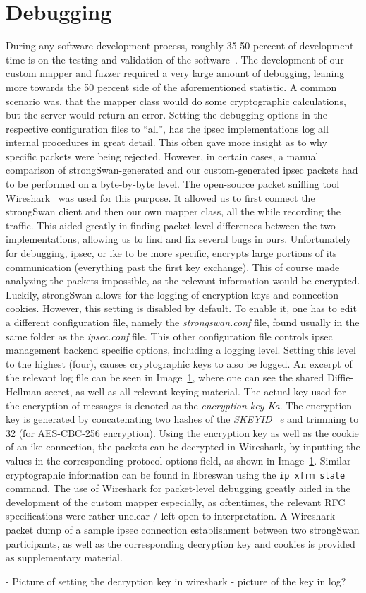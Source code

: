 \section{Debugging}
During any software development process, roughly 35-50 percent of development time is on the testing and validation of the software~\cite{britton2013reversible}. The development of our custom mapper and fuzzer required a very large amount of debugging, leaning more towards the 50 percent side of the aforementioned statistic. A common scenario was, that the mapper class would do some cryptographic calculations, but the server would return an error. Setting the debugging options in the respective configuration files to ``all'', has the \ac{ipsec} implementations log all internal procedures in great detail. This often gave more insight as to why specific packets were being rejected. However, in certain cases, a manual comparison of strongSwan-generated and our custom-generated \ac{ipsec} packets had to be performed on a byte-by-byte level. The open-source packet sniffing tool Wireshark~\cite{doc:wireshark} was used for this purpose. It allowed us to first connect the strongSwan client and then our own mapper class, all the while recording the traffic. This aided greatly in finding packet-level differences between the two implementations, allowing us to find and fix several bugs in ours. Unfortunately for debugging, \ac{ipsec}, or \ac{ike} to be more specific, encrypts large portions of its communication (everything past the first key exchange). This of course made analyzing the packets impossible, as the relevant information would be encrypted. Luckily, strongSwan allows for the logging of encryption keys and connection cookies. However, this setting is disabled by default. To enable it, one has to edit a different configuration file, namely the \emph{strongswan.conf} file, found usually in the same folder as the \emph{ipsec.conf} file. This other configuration file controls \ac{ipsec} management backend specific options, including a logging level. Setting this level to the highest (four), causes cryptographic keys to also be logged. An excerpt of the relevant log file can be seen in Image~\ref{}, where one can see the shared Diffie-Hellman secret, as well as all relevant keying material. The actual key used for the encryption of messages is denoted as the \emph{encryption key Ka}. The encryption key is generated by concatenating two hashes of the \emph{SKEYID\_e} and trimming to \SI{32}{\byte} (for AES-CBC-256 encryption). Using the encryption key as well as the cookie of an \ac{ike} connection, the packets can be decrypted in Wireshark, by inputting the values in the corresponding protocol options field, as shown in Image~\ref{}. Similar cryptographic information can be found in libreswan using the \texttt{ip xfrm state} command. The use of Wireshark for packet-level debugging greatly aided in the development of the custom mapper especially, as oftentimes, the relevant RFC specifications were rather unclear / left open to interpretation. A Wireshark packet dump of a sample \ac{ipsec} connection establishment between two strongSwan participants, as well as the corresponding decryption key and cookies is provided as supplementary material.

- Picture of setting the decryption key in wireshark
- picture of the key in log?
